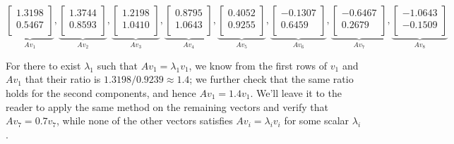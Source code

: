\vspace*{.2cm}
\begin{equation}
\underbrace{
\left[
\begin{array}{r}
1.3198 \\
0.5467 \\
\end{array}
\right]}_{A v_1}, \underbrace{
\left[
\begin{array}{r}
1.3744 \\
0.8593 \\
\end{array}
\right]}_{A v_2}, \underbrace{
\left[
\begin{array}{r}
1.2198 \\
1.0410 \\
\end{array}
\right]}_{A v_3}, \underbrace{
\left[
\begin{array}{r}
0.8795 \\
1.0643 \\
\end{array}
\right]}_{A v_4}, \underbrace{
\left[
\begin{array}{r}
0.4052 \\
0.9255 \\
\end{array}
\right]}_{A v_5},   \underbrace{
\left[
\begin{array}{r}
-0.1307 \\
0.6459 \\
\end{array}
\right]}_{A v_6}, \underbrace{
\left[
\begin{array}{r}
-0.6467 \\
0.2679 \\
\end{array}
\right]}_{A v_7}, \underbrace{
\left[
\begin{array}{r}
-1.0643 \\
-0.1509 \\
\end{array}
\right]}_{A v_8}
\end{equation}

\vspace*{.2cm}
For there to exist $\lambda_1$ such that $Av_1 = \lambda_1 v_1$, we know from the first rows of $v_1$ and $Av_1$ that their ratio is $1.3198/0.9239 \approx 1.4$; we further check that the same ratio holds for the second components, and hence $Av_1 = 1.4 v_1$. We'll leave it to the reader to apply the same method on the remaining vectors and verify that $Av_7 = 0.7 v_7$, while none of the other vectors satisfies $A v_i = \lambda_i v_i$ for some scalar $\lambda_i$.
\Qed

